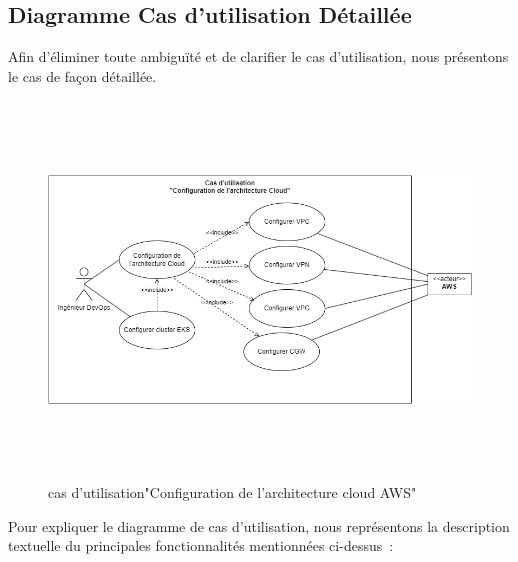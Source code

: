 \subsection{\Large Diagramme Cas d'utilisation Détaillée}
\textsf{\selectfont{}Afin d'éliminer toute ambiguïté et de clarifier le cas d'utilisation, nous présentons le cas de façon détaillée.}
\begin{figure}[H]
    \begin{center}
    \includegraphics[height=10cm]{usecasedet.drawio.png}
    \end{center}
    \caption{cas d’utilisation"Configuration de l'architecture cloud AWS"}
    \end{figure}
    \textsf{\selectfont{}
    Pour expliquer  le diagramme de cas d’utilisation, nous représentons la description textuelle du principales fonctionnalités mentionnées ci-dessus : \\}
